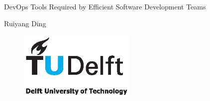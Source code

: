 \begin{titlepage}

\null\vfill

\begin{center}
\LARGE{DevOps Tools Required by Efficient Software Development Teams}
\end{center}

\vspace{1.5cm}

\begin{center}
Ruiyang Ding
\end{center}

\vfill

\begin{figure}[!b]
\centering
\includegraphics[width={0.5\textwidth}]{pics/TUD_logo_color.eps}
\end{figure}

\vspace{2.0cm}

\end{titlepage}

